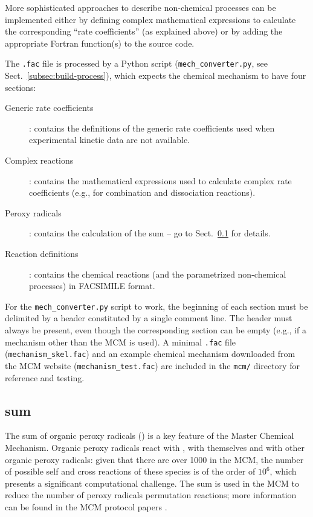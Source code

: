 More sophisticated approaches to describe non-chemical processes can
be implemented either by defining complex mathematical expressions to
calculate the corresponding ``rate coefficients'' (as explained above)
or by adding the appropriate Fortran function(s) to the source code.

The \texttt{.fac} file is processed by a Python script
(\texttt{mech\_converter.py}, see Sect.~\ref{subsec:build-process}),
which expects the chemical mechanism to have four sections:

\begin{description}
\item[Generic rate coefficients] : contains the definitions of the
  generic rate coefficients used when experimental kinetic data are
  not available.
\item[Complex reactions] : contains the mathematical expressions used
  to calculate complex rate coefficients (e.g., for combination and
  dissociation reactions).
\item[Peroxy radicals] : contains the calculation of the  sum
  -- go to Sect.~\ref{subsec:ro2-sum} for details.
\item[Reaction definitions] : contains the chemical reactions (and the
  parametrized non-chemical processes) in FACSIMILE format.
\end{description}

For the \texttt{mech\_converter.py} script to work, the beginning of
each section must be delimited by a header constituted by a single
comment line.  The header must always be present, even though the
corresponding section can be empty (e.g., if a mechanism other than
the MCM is used). A minimal \texttt{.fac} file
(\texttt{mechanism\_skel.fac}) and an example chemical mechanism
downloaded from the MCM website (\texttt{mechanism\_test.fac}) are
included in the \texttt{mcm/} directory for reference and testing.

\subsection{ sum} \label{subsec:ro2-sum}

The sum of organic peroxy radicals () is a key feature of the
Master Chemical Mechanism. Organic peroxy radicals react with
, with themselves and with other organic peroxy radicals:
given that there are over 1000  in the MCM, the number of
possible self and cross reactions of these species is of the order of
$10^6$, which presents a significant computational challenge. The
 sum is used in the MCM to reduce the number of peroxy
radicals permutation reactions; more information can be found in the
MCM protocol papers \citep{jenkin_1997, saunders_2003}.

